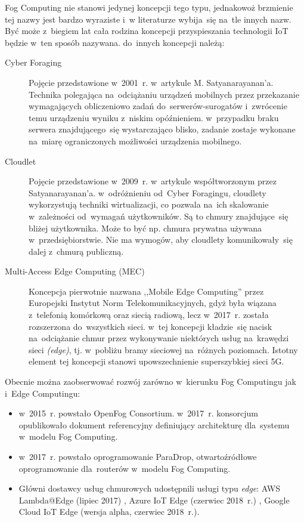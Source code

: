 \documentclass[12pt,a4paper,twoside,titlepage,openright]{book}
\begin{document}
Fog Computing nie stanowi jedynej koncepcji tego typu, jednakowoż brzmienie tej nazwy jest bardzo wyraziste i~w literaturze wybija~się na~tle innych nazw. Być może z~biegiem lat cała rodzina koncepcji przyspieszania technologii IoT będzie w~ten sposób nazywana. do~innych koncepcji należą:
\begin{description}
\item [Cyber Foraging] Pojęcie przedstawione w~2001~r. w~artykule M. Satyanarayanan'a. Technika polegająca na~odciążaniu urządzeń mobilnych przez przekazanie wymagających obliczeniowo zadań do~serwerów-surogatów i~zwrócenie temu urządzeniu wyniku z~niskim opóźnieniem. w~przypadku braku serwera znajdującego~się wystarczająco blisko, zadanie zostaje wykonane na~miarę ograniczonych możliwości urządzenia mobilnego. \cite{fogArticle, fog5g}
\item [Cloudlet] Pojęcie przedstawione w~2009~r. w~artykule współtworzonym przez Satyanarayanan'a. w~odróżnieniu od~Cyber Foragingu, cloudlety wykorzystują techniki wirtualizacji, co pozwala na~ich skalowanie w~zależności od~wymagań użytkowników. Są to chmury znajdujące~się bliżej użytkownika. Może to być np. chmura prywatna używana w~przedsiębiorstwie. Nie ma wymogów, aby cloudlety komunikowały~się dalej z~chmurą publiczną. \cite{fogArticle, fog5g}
\item [Multi-Access Edge Computing (MEC)] Koncepcja pierwotnie nazwana ,,Mobile Edge Computing'' przez Europejski Instytut Norm Telekomunikacyjnych, gdyż była wiązana z~telefonią komórkową oraz siecią radiową, lecz w~2017~r. została rozszerzona do~wszystkich sieci. w~tej koncepcji kładzie~się nacisk na~odciążanie chmur przez wykonywanie niektórych usług na~krawędzi sieci \textit{(edge)}, tj. w~pobliżu bramy sieciowej na~różnych poziomach. Istotny element tej koncepcji stanowi upowszechnienie superszybkiej sieci 5G. \cite{fogArticle, fog5g}
\end{description}

Obecnie można zaobserwować rozwój zarówno w~kierunku Fog Computingu jak i~Edge Computingu:
\begin{itemize}
\item w~2015~r. powstało OpenFog Consortium. w~2017~r. konsorcjum opublikowało dokument referencyjny definiujący architekturę dla~systemu w~modelu Fog Computing. \cite{fogArticle, iotArchitects}
\item w~2017~r. powstało oprogramowanie ParaDrop, otwartoźródłowe oprogramowanie dla~routerów w~modelu Fog Computing. \cite{fog5g}
\item Główni dostawcy usług chmurowych udostępnili usługi typu \textit{edge}: AWS Lambda@Edge (lipiec 2017) \cite{siteAmazonLambdaEdge}, Azure IoT Edge (czerwiec 2018~r.) \cite{siteAzureIotEdge}, Google Cloud IoT Edge (wersja alpha, czerwiec 2018~r.)\cite{siteGoogleIotEdge}. 
\end{itemize}
\end{document}
